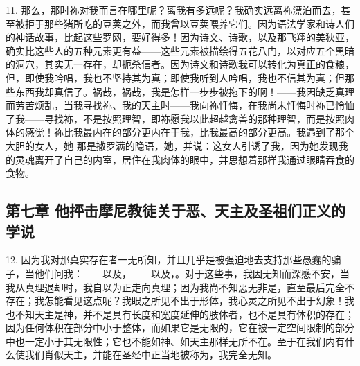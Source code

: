 11. 那么，那时祢对我而言在哪里呢？离我有多远呢？我确实远离祢漂泊而去，甚至被拒于那些猪所吃的豆荚之外，而我曾以豆荚喂养它们。因为语法学家和诗人们的神话故事，比起这些罗网，要好得多！因为诗文、诗歌，以及那飞翔的美狄亚，确实比这些人的五种元素更有益——这些元素被描绘得五花八门，以对应五个黑暗的洞穴，其实无一存在，却扼杀信者。因为诗文和诗歌我可以转化为真正的食粮，但，即使我吟唱，我也不坚持其为真；即使我听到人吟唱，我也不信其为真；但那些东西我却真信了。祸哉，祸哉，我是怎样一步步被拖下的啊！——我因缺乏真理而劳苦烦乱，当我寻找祢、我的天主时——我向祢忏悔，在我尚未忏悔时祢已怜恤了我——寻找祢，不是按照理智，即祢愿我以此超越禽兽的那种理智，而是按照肉体的感觉！祢比我最内在的部分更内在于我，比我最高的部分更高。我遇到了那个大胆的女人，她 那是撒罗满的隐语，她，并说：这女人引诱了我，因为她发现我的灵魂离开了自己的内室，居住在我肉体的眼中，并思想着那样我通过眼睛吞食的食物。\par


\subsection{第七章 他抨击摩尼教徒关于恶、天主及圣祖们正义的学说}

12. 因为我对那真实存在者一无所知，并且几乎是被强迫地去支持那些愚蠢的骗子，当他们问我：——以及，——以及，。对于这些事，我因无知而深感不安，当我从真理退却时，我自以为正走向真理；因为我尚不知恶无非是，直至最后完全不存在；我怎能看见这点呢？我眼之所见不出于形体，我心灵之所见不出于幻象！我也不知天主是神，并不是具有长度和宽度延伸的肢体者，也不是具有体积的存在；因为任何体积在部分中小于整体，而如果它是无限的，它在被一定空间限制的部分中也一定小于其无限性；它也不能如神、如天主那样无所不在。至于在我们内有什么使我们肖似天主，并能在圣经中正当地被称为，我完全无知。\par

